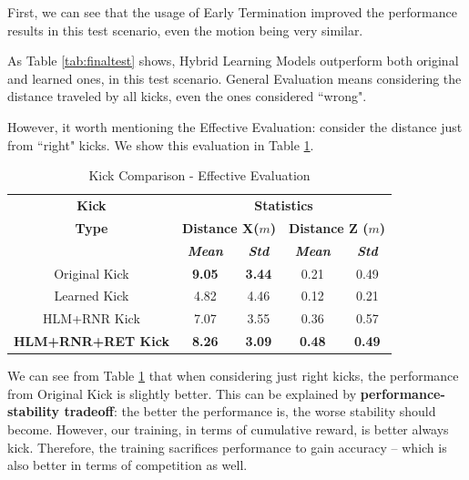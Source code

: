 First, we can see that the usage of Early Termination improved the performance results in this test scenario, even the motion being very similar.

As Table \ref{tab:finaltest} shows, Hybrid Learning Models outperform both original and learned ones, in this test scenario. General Evaluation means considering the distance traveled by all kicks, even the ones considered ``wrong".

However, it worth mentioning the Effective Evaluation: consider the distance just from ``right" kicks. We show this evaluation in Table \ref{tab:finaltesteff}.

\begin{table}[!htbp]
	\caption{Kick Comparison - Effective Evaluation}
	\begin{center} 
		\begin{tabular}{|c|c|c|c|c|}
			\hline
			\textbf{Kick}&\multicolumn{4}{|c|}{\textbf{Statistics}} \\
			\cline{2-5} 
			\textbf{Type} &  \multicolumn{2}{|c|}{\textbf{Distance X(\(m\))}}& 
			\multicolumn{2}{|c|}{\textbf{Distance Z (\(m\))}}\\
			\cline {2-5} 
			& \textbf{\textit{Mean}}& \textbf{\textit{Std}}
			& \textbf{\textit{Mean}}& \textbf{\textit{Std}} \\
			\hline
			Original Kick  & \textbf{9.05} & \textbf{3.44} & 0.21 & 0.49 \\
			\hline
			Learned Kick  & 4.82 & 4.46 & 0.12 & 0.21 \\
			\hline
			HLM+RNR Kick & 7.07 & 3.55 & 0.36 & 0.57  \\
			\hline
			\textbf{HLM+RNR+RET Kick} & \textbf{8.26} & \textbf{3.09} & \textbf{0.48} & \textbf{0.49}  \\
			\hline
		\end{tabular}
		\label{tab:finaltesteff}
	\end{center}
\end{table}

We can see from Table \ref{tab:finaltesteff} that when considering just right kicks, the performance from Original Kick is slightly better. This can be explained by \textbf{performance-stability tradeoff}: the better the performance is, the worse stability should become. However, our training, in terms of cumulative reward, is better always kick. Therefore, the training sacrifices performance to gain accuracy -- which is also better in terms of competition as well.